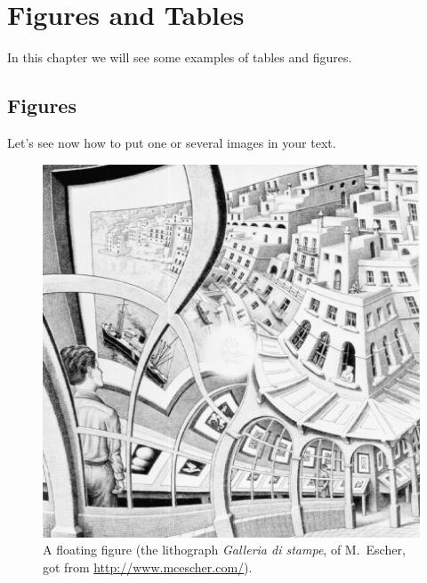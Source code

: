 
\chapter{Figures and Tables}
\label{ch:figures_tables}
In this chapter we will see some examples of tables and figures.

\section{Figures}
Let's see now how to put one or several images in your text.


\begin{figure}[ht]
    \centering
    \includegraphics[width=0.5\columnwidth]{../figures/images/galleria_stampe}
    \caption[A floating figure]{A floating figure (the lithograph \emph{Galleria di stampe}, of M.~Escher, got from \url{http://www.mcescher.com/}).}
    \label{fig:galleria}
\end{figure}

